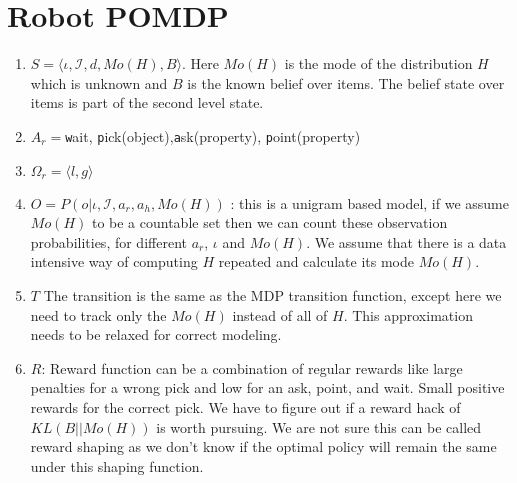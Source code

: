 \documentclass{article}
\newcommand{\myitem}{\stepcounter{enumi}\item[$*$\theenumi.]}
\begin{document}
\section{Robot POMDP}
\begin{enumerate}


\item $S = \langle \iota, \mathcal{I}, d, Mo(H), B \rangle$.
Here $Mo(H)$ is the mode of the distribution $H$ which is unknown and $B$ is the known belief over items. The belief state over items is part of the second level state.
\item $A_r = ${{\texttt wait}, {\texttt pick(object)},{\texttt  ask(property)}, {\texttt  point(property)}}
\item $\Omega_r = \langle l,g \rangle$
\myitem $O = P(o | \iota, \mathcal{I}, a_r, a_h, Mo(H))$ : this is a unigram based model, if we assume $Mo(H)$ to be a countable set then we can count these observation probabilities, for different $a_r$, $\iota$ and $Mo(H)$. We assume that there is a data intensive way of computing $H$ repeated and calculate its mode $Mo(H)$.
\myitem $T$ The transition is the same as the MDP transition function, except here we need to track only the $Mo(H)$ instead of all of $H$. This approximation needs to be relaxed for correct modeling.
\item $R$: Reward function can be a combination of regular rewards like large penalties for a wrong pick and low for an ask, point, and wait. Small positive rewards for the correct pick. We have to figure out if a reward hack of $KL(B||Mo(H))$ is worth pursuing. We are not sure this can be called reward shaping as we don't know if the optimal policy will remain the same under this shaping function. 


\end{enumerate}
\end{document}
